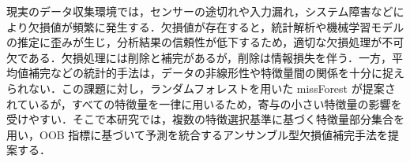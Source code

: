 現実のデータ収集環境では，センサーの途切れや入力漏れ，システム障害などにより欠損値が頻繁に発生する．欠損値が存在すると，統計解析や機械学習モデルの推定に歪みが生じ，分析結果の信頼性が低下するため，適切な欠損処理が不可欠である．欠損処理には削除と補完があるが，削除は情報損失を伴う．一方，平均値補完などの統計的手法は，データの非線形性や特徴量間の関係を十分に捉えられない．この課題に対し，ランダムフォレストを用いた missForest が提案されているが，すべての特徴量を一律に用いるため，寄与の小さい特徴量の影響を受けやすい．そこで本研究では，複数の特徴選択基準に基づく特徴量部分集合を用い，OOB 指標に基づいて予測を統合するアンサンブル型欠損値補完手法を提案する．
